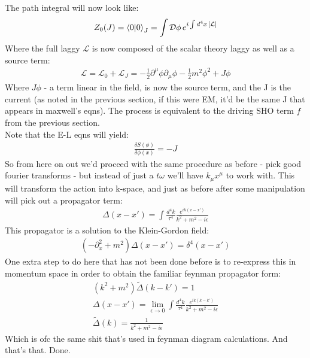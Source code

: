 \documentclass[10pt]{article}
\begin{document}
The path integral will now look like:
\begin{align}
	Z_0(J) = \braket{0}{0}_J = \int \mathcal{D}\phi\, e^{i\int d^4x \, [\mathcal{L}]}
\end{align}
Where the full laggy $\mathcal{L}$ is now composed of the scalar theory laggy as well as a source term:
\begin{align}
	\mathcal{L}=\mathcal{L}_0+\mathcal{L}_J=-\frac{1}{2}\partial^\mu\phi\partial_\mu\phi -\frac{1}{2}m^2\phi^2 + J\phi
\end{align}
Where $J\phi$ - a term linear in the field, is now the source term, and the J is the current (as noted in the previous section, if this were EM, it'd be the same J that appears in maxwell's eqns). The process is equivalent to the driving SHO term $f$ from the previous section.\\
Note that the E-L eqns will yield:
\begin{align}
	\frac{\delta S(\phi)}{\delta \phi(x)} = -J
\end{align}
So from here on out we'd proceed with the same procedure as before - pick good fourier transforms - but instead of just a $t\omega$ we'll have $k_\mu x^\mu$ to work with. This will transform the action into k-space, and just as before after some manipulation will pick out a propagator term:
\begin{align}
	\Delta(x-x')=\int \frac{d^4k}{\tau^4} \frac{e^{ik(x-x')}}{k^2+m^2-i\epsilon} 
\end{align}
This propagator is a solution to the Klein-Gordon field:
\begin{align}
	(-\partial^2_x+m^2)\Delta(x-x')=\delta^4(x-x')
\end{align}
One extra step to do here that has not been done before is to re-express this in momentum space in order to obtain the familiar feynman propagator form:
\begin{align}
	(k^2+m^2)\tilde{\Delta}(k-k')=1 \\[1.5Ex]
	\Delta(x-x')= \lim_{\epsilon \to 0} \int \frac{d^4k}{\tau^4} \frac{e^{ik(k-k')}}{k^2+m^2-i\epsilon} \\[1.5Ex]
	\tilde{\Delta}(k)= \frac{1}{k^2+m^2-i\epsilon} 
\end{align}
Which is ofc the same shit that's used in feynman diagram calculations. And that's that. Done.
\end{document}
